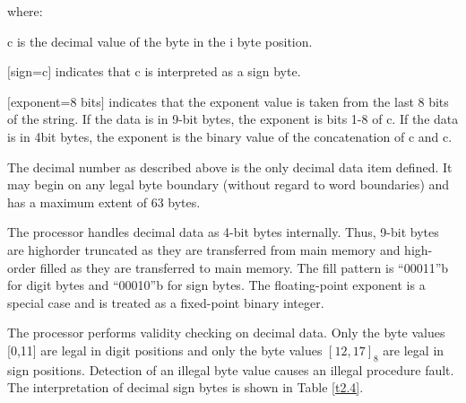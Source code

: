 where:

\begin{description}

\item
c is the decimal value of the byte in the i byte position.

\item
$[$sign=c$]$ indicates that c is interpreted as a sign byte.

\item
$[$exponent=8 bits$]$ indicates that the exponent value is taken from the last 8
bits of the string. If the data is in 9-bit bytes, the exponent is bits 1-8 of
c. If the data is in 4bit bytes, the exponent is the binary value of the
concatenation of c and c.  

\end{description}

The decimal number as described above is the only decimal data item defined. It
may begin on any legal byte boundary (without regard to word boundaries) and
has a maximum extent of 63 bytes.


The processor handles decimal data as 4-bit bytes internally. Thus, 9-bit bytes
are highorder truncated as they are transferred from main memory and high-order
filled as they are transferred to main memory. The fill pattern is {``}00011''b
for digit bytes and {``}00010''b for sign bytes. The floating-point exponent is
a special case and is treated as a fixed-point binary integer.


The processor performs validity checking on decimal data. Only the byte values
[0,11] are legal in digit positions and only the byte values $[12,17]_8$ are
legal in sign positions. Detection of an illegal byte value causes an illegal
procedure fault. The interpretation of decimal sign bytes is shown in Table
\ref{t2.4}.


